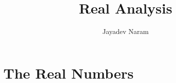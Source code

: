 \documentclass[11pt,a4paper]{article}
\author{Jayadev Naram}
\title{Real Analysis}
\begin{document}
\date{}
\maketitle
\tableofcontents

\theoremstyle{plain}
\newtheorem{theorem}{Theorem}[section]
\newtheorem{corollary}{Corollary}[theorem]

\newtheorem{lemma}[theorem]{Lemma}
\newtheorem{proposition}[theorem]{Proposition}
\newtheorem{axiom}[theorem]{Axiom}

\theoremstyle{definition}
\newtheorem{definition}[theorem]{Definition}
\newtheorem{example}[theorem]{Example}
\newtheorem{remark}[theorem]{Remark}

\newcommand{\R}{\mathbb{R}}
\newcommand{\B}{\mathbb{B}}
\newcommand{\A}{\mathcal{A}}
\newcommand{\M}{\mathcal{M}}
\newcommand{\N}{\mathcal{N}}
\newcommand{\h}{\mathcal{H}}
\newcommand{\T}{\mathcal{T}}
\newcommand{\Prob}{\mathbb{P}}
\newcommand{\Dist}{\mathcal{D}}
\newcommand{\perpProj}{\mathcal{P}^\perp}
\newcommand{\bb}{\mathbb{B}}
\newcommand{\Sprod}{\mathbb{S}_{xy}}
\newcommand{\highlight}[1]{\underline{\textit{\textbf{#1}}}}
\newcommand{\mapping}[3]{#1:#2\rightarrow #3}
\newcommand{\doubt}{\highlight{[??]}}
\newcommand{\bigvert}[2]{\left.#1\right|_{#2}}
\newcommand{\sdnn}[1]{${#1}$}
\newcommand{\bsdnn}[1]{$\boldsymbol{#1}$}
\newcommand{\ifthen}[2]{\textbf{(#1)}\boldsymbol{\implies}\textbf{(#2)}}
\newcommand{\bsdn}[1]{\boldsymbol{#1}}
\newcommand{\forward}{$(\implies)$\ }
\newcommand{\converse}{$(\impliedby)$\ }
\newcommand{\Lt}[1]{\underset{#1\rightarrow 0}{Lt}}
\newcommand{\norm}[1]{\|#1\|}
\newcommand{\dparder}[2]{\dfrac{\partial #1}{\partial x_{#2}}}
\newcommand{\fparder}[2]{\frac{\partial #1}{\partial x_{#2}}}
\newcommand{\parder}[2]{\partial #1/\partial x_{#2}}
\newcommand{\parop}[1]{\dfrac{\partial}{\partial x_{#1}}}
\newcommand{\innerproduct}[2]{\langle #1, #2 \rangle}
\newcommand{\metric}[2]{[#1, #2]}
\newcommand{\genst}{St_B(n,p)}
\newcommand{\igenst}[1]{St_{B_{#1}}(n_{#1},p)}
\newcommand{\realmat}[2]{\R^{#1\times #2}}
\newcommand{\Skew}{\mathcal{S}_{skew}(p)}
\newcommand{\Sym}{\mathcal{S}_{sym}(p)}
\newcommand{\XperpB}{X_{B^\perp}}
\newcommand{\polarRetr}{R^{polar}_X}
\newcommand{\qrRetr}{R^{QR}_X}
\newcommand{\vectransport}{\mathcal{T}}
\newcommand{\grad}{\text{grad}\,}
\newcommand{\hess}{\text{Hess}\,}

\section{The Real Numbers}
\end{document}
